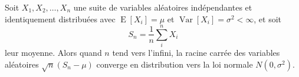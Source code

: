 \documentclass{article}
\begin{document}
Soit $X_1, X_2, \ldots, X_n$ une suite de variables aléatoires
indépendantes et identiquement distribuées avec 
$\operatorname{E}[X_i] = \mu$ et $\operatorname{Var}[X_i] = \sigma^2 < \infty$, 
et soit
\begin{equation*}
S_n = \frac{1}{n}\sum_{i}^{n} X_i
\end{equation*}
leur moyenne. Alors quand $n$ tend vers l'infini,
la racine carrée des variables aléatoires $\sqrt{n}(S_n - \mu)$
converge en distribution vers la loi normale $N(0, \sigma^2)$.

\end{document}
